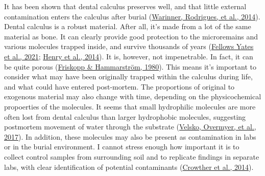 \documentclass[
  letterpaper,
]{book}
\begin{document}
It has been shown that dental calculus preserves well, and that little
external contamination enters the calculus after burial
(\protect\hyperlink{ref-warinnerPathogensHost2014}{Warinner, Rodrigues,
et al., 2014}). Dental calculus is a robust material. After all, it's
made from a lot of the same material as bone. It can clearly provide
good protection to the microremains and various molecules trapped
inside, and survive thousands of years
(\protect\hyperlink{ref-yatesOralMicrobiome2021}{Fellows Yates et al.,
2021}; \protect\hyperlink{ref-henryNeanderthalCalculus2014}{Henry et
al., 2014}). It is, however, not impenetrable. In fact, it can be quite
porous (\protect\hyperlink{ref-friskoppComparativeScanning1980}{Friskopp
\& Hammarström, 1980}). This means it's important to consider what may
have been originally trapped within the calculus during life, and what
could have entered post-mortem. The proportions of original to exogenous
material may also change with time, depending on the physicochemical
propoerties of the molecules. It seems that small hydrophilic molecules
are more often lost from dental calculus than larger hydrophobic
molecules, suggesting postmortem movement of water through the substrate
(\protect\hyperlink{ref-velskoDentalCalculus2017}{Velsko, Overmyer, et
al., 2017}). In addition, these molecules may also be present as
contamination in labs or in the burial environment. I cannot stress
enough how important it is to collect control samples from surrounding
soil and to replicate findings in separate labs, with clear
identification of potential contaminants
(\protect\hyperlink{ref-crowtherDocumentingContamination2014}{Crowther
et al., 2014}).
\end{document}
